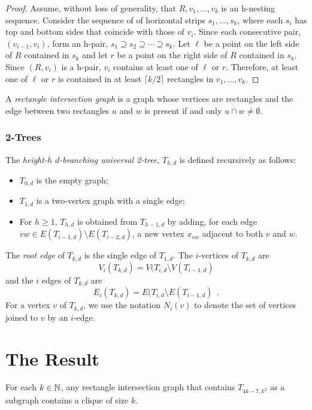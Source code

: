 \documentclass[lotsofwhite]{patmorin}
\begin{document}
\begin{proof}
   Assume, without loss of generality, that $R,v_1,\ldots,v_k$
   is an h-nesting sequence.  Consider the sequence of of
   horizontal strips $s_1,\ldots,s_k$, where each $s_i$ has top
   and bottom sides that coincide with those of $v_i$. Since each
   consecutive pair, $(v_{i-1},v_i)$, form an h-pair, $s_1\supseteq
   s_2\supseteq\cdots\supseteq s_k$.  Let $\ell$ be a point on the left
   side of $R$ contained in $s_k$ and let $r$ be a point on the right
   side of $R$ contained in $s_k$.  Since $(R,v_i)$ is a h-pair, $v_i$
   contains at least one of $\ell$ or $r$.  Therefore, at least one of
   $\ell$ or $r$ is contained in at least $\lceil k/2\rceil$ rectangles
   in $v_1,\ldots,v_k$.
\end{proof}

A \emph{rectangle intersection graph} is a graph whose vertices are
rectangles and the edge between two rectangles $u$ and $w$ is present
if and only $u\cap w\neq \emptyset$.

\subsubsection{2-Trees}


The \emph{height-$h$ $d$-branching universal 2-tree}, $T_{h,d}$ is
defined recursively as follows:
\begin{itemize}
  \item $T_{0,d}$ is the empty graph;
  \item $T_{1,d}$ is a two-vertex graph with a single edge;
  \item For $h\ge 1$, $T_{h,d}$ is obtained from $T_{h-1,d}$ by adding,
     for each edge $vw \in E(T_{i-1,d})\setminus E(T_{i-2,d})$,
     a new vertex $x_{vw}$ adjacent to both $v$ and $w$.
\end{itemize}
The \emph{root edge} of $T_{k,d}$ is the single edge of $T_{1,d}$.
The $i$-vertices of $T_{k,d}$ are \[ V_i(T_{k,d}) = V(T_{i,d}\setminus
V(T_{i-1,d}) \] and the $i$ edges of $T_{k,d}$ are \[ E_i(T_{k,d})
= E(T_{i,d}\setminus E(T_{i-1,d}) \enspace . \] For a vertex $v$ of
$T_{k,d}$, we use the notation $N_i(v)$ to denote the set of vertices
joined to $v$ by an $i$-edge.


\section{The Result}

\begin{thm}
  For each $k\in \mathbb{N}$, any rectangle intersection graph that contains
  $T_{4k-7,k^2}$ as a subgraph contains a clique of size $k$.
\end{thm}
\end{document}
